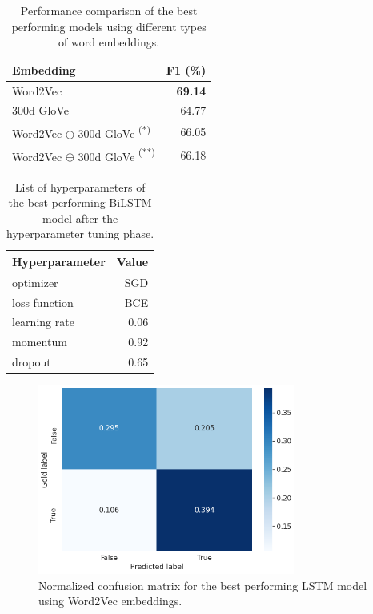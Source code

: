 \documentclass[11pt,a4paper]{article}
\begin{document}
\begin{table}[H]
  \centering
  \begin{tabular}{lr} \toprule
  \textbf{Embedding} & \textbf{F1 (\%)} \\ \midrule
  Word2Vec  & \textbf{69.14} \\
  300d GloVe & 64.77 \\
  Word2Vec $\oplus$ 300d GloVe \footnotesize{\textsuperscript{(*)}} & 66.05 \\
  Word2Vec $\oplus$ 300d GloVe \footnotesize{\textsuperscript{(**)}} & 66.18 \\
  \bottomrule
  \end{tabular}
  \caption{\label{embedding_models} Performance comparison of the best performing models using different types of word embeddings. }
\end{table}

\begin{table}[H]
  \centering
  \begin{tabular}{lr} \toprule
  \textbf{Hyperparameter} & \textbf{Value} \\ \midrule
  optimizer  & SGD \\
  loss function  & BCE \\
  learning rate  & 0.06 \\
  momentum  & 0.92 \\
  dropout & 0.65 \\
  \bottomrule
  \end{tabular}
  \caption{\label{lstm_hparams} List of hyperparameters of the best performing BiLSTM model after the hyperparameter tuning phase. }
\end{table}

\begin{figure}[H]
  \centering
  \includegraphics[width=8.45cm,keepaspectratio]{images/confusion_matrix.png}
  \caption{Normalized confusion matrix for the best performing LSTM model using Word2Vec embeddings.}\label{fig:cf}
\end{figure}
\end{document}
